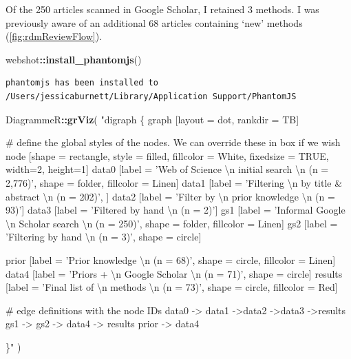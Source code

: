 \documentclass[12pt,twoside,openany]{reedthesis}
\newenvironment{Shaded}{\begin{snugshade}}{\end{snugshade}}
\newcommand{\KeywordTok}[1]{\textcolor[rgb]{0.13,0.29,0.53}{\textbf{#1}}}
\newcommand{\CharTok}[1]{\textcolor[rgb]{0.31,0.60,0.02}{#1}}
\newcommand{\StringTok}[1]{\textcolor[rgb]{0.31,0.60,0.02}{#1}}
\newcommand{\OperatorTok}[1]{\textcolor[rgb]{0.81,0.36,0.00}{\textbf{#1}}}
\newcommand{\NormalTok}[1]{#1}
\begin{document}
Of the 250 articles scanned in Google Scholar, I retained 3 methods. I
was previously aware of an additional 68 articles containing `new'
methods (\ref{fig:rdmReviewFlow}).
\begin{Shaded}
\begin{Highlighting}[]
\NormalTok{webshot}\OperatorTok{::}\KeywordTok{install_phantomjs}\NormalTok{()}
\end{Highlighting}
\end{Shaded}
\begin{verbatim}
phantomjs has been installed to /Users/jessicaburnett/Library/Application Support/PhantomJS
\end{verbatim}
\begin{Shaded}
\begin{Highlighting}[]
\NormalTok{DiagrammeR}\OperatorTok{::}\KeywordTok{grViz}\NormalTok{(}
  \StringTok{"digraph \{}
\StringTok{  graph [layout = dot, rankdir = TB]}

\StringTok{  # define the global styles of the nodes. We can override these in box if we wish}
\StringTok{  node [shape = rectangle, style = filled, fillcolor = White, fixedsize = TRUE, width=2, height=1]}
\StringTok{  data0 [label = 'Web of Science }\CharTok{\textbackslash{}n}\StringTok{ initial search }\CharTok{\textbackslash{}n}\StringTok{ (n = 2,776)', shape = folder, fillcolor = Linen]}
\StringTok{  data1 [label = 'Filtering }\CharTok{\textbackslash{}n}\StringTok{ by title & abstract }\CharTok{\textbackslash{}n}\StringTok{ (n = 202)', ]}
\StringTok{  data2 [label = 'Filter by }\CharTok{\textbackslash{}n}\StringTok{ prior knowledge }\CharTok{\textbackslash{}n}\StringTok{ (n = 93)']}
\StringTok{  data3 [label = 'Filtered by hand }\CharTok{\textbackslash{}n}\StringTok{ (n = 2)']}
\StringTok{  }
\StringTok{  gs1 [label = 'Informal Google }\CharTok{\textbackslash{}n}\StringTok{ Scholar search }\CharTok{\textbackslash{}n}\StringTok{ (n = 250)', shape = folder, fillcolor = Linen]}
\StringTok{  gs2 [label = 'Filtering by hand }\CharTok{\textbackslash{}n}\StringTok{ (n = 3)', shape = circle]}

\StringTok{   }
\StringTok{  prior [label = 'Prior knowledge }\CharTok{\textbackslash{}n}\StringTok{ (n = 68)', shape = circle, fillcolor = Linen]}
\StringTok{  data4 [label = 'Priors + }\CharTok{\textbackslash{}n}\StringTok{ Google Scholar }\CharTok{\textbackslash{}n}\StringTok{ (n = 71)', shape = circle]}
\StringTok{  }
\StringTok{  results [label = 'Final list of }\CharTok{\textbackslash{}n}\StringTok{ methods }\CharTok{\textbackslash{}n}\StringTok{ (n = 73)', shape = circle, fillcolor = Red]}

\StringTok{# edge definitions with the node IDs}
\StringTok{data0 -> data1 ->data2 ->data3 ->results}
\StringTok{gs1 -> gs2 -> data4 -> results}
\StringTok{prior -> data4}

\StringTok{\}"}
\NormalTok{  )}
\end{Highlighting}
\end{Shaded}
\end{document}

